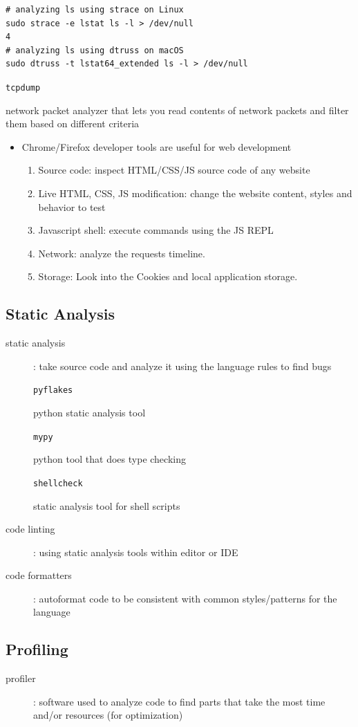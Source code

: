 \documentclass[letterpaper,12pt]{article}
\newcommand*{\lstitem}[1]{
  \setbox0\hbox{\lstinline{#1}}
  \item[\usebox0]
}
\begin{document}
\begin{lstlisting}
# analyzing ls using strace on Linux
sudo strace -e lstat ls -l > /dev/null
4
# analyzing ls using dtruss on macOS
sudo dtruss -t lstat64_extended ls -l > /dev/null
\end{lstlisting}

\begin{description}
 \lstitem{tcpdump} network packet analyzer that lets you read contents of network packets and filter them based on different criteria
\end{description}

\begin{itemize}
 \item Chrome/Firefox developer tools are useful for web development
       \begin{enumerate}
        \item Source code: inspect HTML/CSS/JS source code of any website
        \item Live HTML, CSS, JS modification: change the website content, styles and behavior to test
        \item Javascript shell: execute commands using the JS REPL
        \item Network: analyze the requests timeline.
        \item Storage: Look into the Cookies and local application storage.
       \end{enumerate}
\end{itemize}

\subsection{Static Analysis}
\begin{description}
 \item[static analysis]: take source code and analyze it using the language rules to find bugs
       \lstitem{pyflakes} python static analysis tool
       \lstitem{mypy} python tool that does type checking
       \lstitem{shellcheck} static analysis tool for shell scripts
 \item[code linting]: using static analysis tools within editor or IDE
 \item[code formatters]: autoformat code to be consistent with common styles/patterns for the language
\end{description}

\subsection{Profiling}
\begin{description}
 \item[profiler]: software used to analyze code to find parts that take the most time and/or resources (for optimization)
\end{description}
\end{document}
